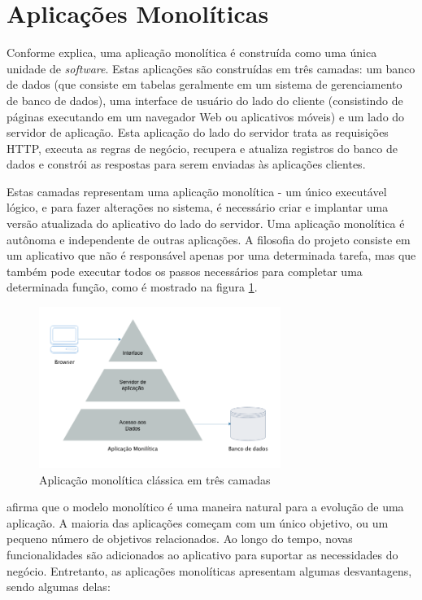 \section{Aplicações Monolíticas}\label{sec:monolitico}

Conforme  explica, uma aplicação monolítica é construída como uma única unidade de \textit{software}. Estas aplicações são construídas em três camadas: um banco de dados (que consiste em tabelas geralmente em um sistema de gerenciamento de banco de dados), uma interface de usuário do lado do cliente (consistindo de páginas executando em um navegador Web ou aplicativos móveis) e um lado do servidor de aplicação. Esta aplicação do lado do servidor trata as requisições HTTP, executa as regras de negócio, recupera e atualiza registros do banco de dados e constrói as respostas para serem enviadas às aplicações clientes. 

Estas camadas representam uma aplicação monolítica - um único executável lógico, e para fazer alterações no sistema, é necessário criar e implantar uma versão atualizada do aplicativo do lado do servidor. Uma aplicação monolítica é autônoma e independente de outras aplicações. A filosofia do projeto consiste em um aplicativo que não é responsável apenas por uma determinada tarefa, mas que também pode executar todos os passos necessários para completar uma determinada função, como é mostrado na figura \ref{fig:three-tier}.

\begin{figure}[htbp]
    \centering
    \includegraphics[width=0.7\textwidth]{figuras/monolithic-3-tier.png}
    \caption{Aplicação monolítica clássica em três camadas}
    \label{fig:three-tier}
\end{figure}

 afirma que o modelo monolítico é uma maneira natural para a evolução de uma aplicação. A maioria das aplicações começam com um único objetivo, ou um pequeno número de objetivos relacionados. Ao longo do tempo, novas funcionalidades são adicionados ao aplicativo para suportar as necessidades do negócio. Entretanto, as aplicações monolíticas apresentam algumas desvantagens, sendo algumas delas: 

